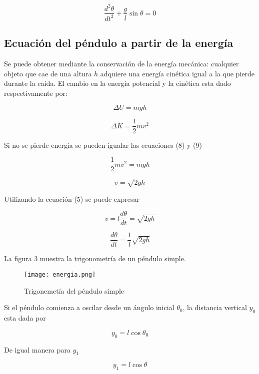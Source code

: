 \documentclass[12pt]{article}
\begin{document}
$$\frac{d^2 \theta}{dt^2}+ \frac{g}{l} \sin \theta =0 $$

\subsection{Ecuación del péndulo a partir de la energía}

Se puede obtener mediante la conservación de la energía mecánica: cualquier objeto que cae de una altura $h$ adquiere una energía cinética igual a la que pierde durante la caída. El cambio en la energía potencial y la cinética esta dado respectivamente por:

\begin{equation}
\Delta U=mgh
\end{equation}

\begin{equation}
\Delta K=\frac{1}{2} mv^2
\end{equation}

Si no se pierde energía se pueden igualar las ecuaciones (8) y (9)

\begin{equation}
\frac{1}{2} mv^2 =mgh
\end{equation}

$$v=\sqrt{2gh}$$

Utilizando la ecuación (5) se puede expresar

\begin{equation}
v = l\frac{d\theta}{dt}= \sqrt{2gh}
\end{equation}

$$\frac{d\theta}{dt}=\frac{1}{l}\sqrt{2gh}$$

La figura 3 muestra la trigonometría de un péndulo simple.

\begin{figure}[H]
\centering		 			
\texttt{[image: energia.png]}
\caption{Trigonemetía del péndulo simple}
\end{figure} 

Si el péndulo comienza a oscilar desde un ángulo inicial $\theta _0$, la distancia vertical $y_0$ esta dada por

\begin{equation}
y_0 = l\cos \theta_0
\end{equation}

De igual manera para $y_1$

\begin{equation}
y_1= l\cos \theta
\end{equation}
\end{document}

